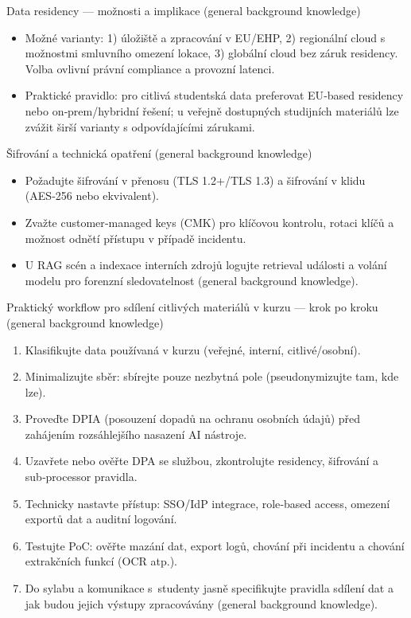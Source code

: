 Data residency — možnosti a implikace (general background knowledge)
\begin{itemize}
  \item Možné varianty: 1) úložiště a zpracování v EU/EHP, 2) regionální cloud s možnostmi smluvního omezení lokace, 3) globální cloud bez záruk residency. Volba ovlivní právní compliance a provozní latenci.
  \item Praktické pravidlo: pro citlivá studentská data preferovat EU‑based residency nebo on‑prem/hybridní řešení; u veřejně dostupných studijních materiálů lze zvážit širší varianty s odpovídajícími zárukami.
\end{itemize}

Šifrování a technická opatření (general background knowledge)
\begin{itemize}
  \item Požadujte šifrování v přenosu (TLS 1.2+/TLS 1.3) a šifrování v klidu (AES‑256 nebo ekvivalent).
  \item Zvažte customer‑managed keys (CMK) pro klíčovou kontrolu, rotaci klíčů a možnost odnětí přístupu v případě incidentu.
  \item U RAG scén a indexace interních zdrojů logujte retrieval události a volání modelu pro forenzní sledovatelnost (general background knowledge).
\end{itemize}

Praktický workflow pro sdílení citlivých materiálů v kurzu — krok po kroku (general background knowledge)
\begin{enumerate}
  \item Klasifikujte data používaná v kurzu (veřejné, interní, citlivé/osobní).
  \item Minimalizujte sběr: sbírejte pouze nezbytná pole (pseudonymizujte tam, kde lze).
  \item Proveďte DPIA (posouzení dopadů na ochranu osobních údajů) před zahájením rozsáhlejšího nasazení AI nástroje.
  \item Uzavřete nebo ověřte DPA se službou, zkontrolujte residency, šifrování a sub‑processor pravidla.
  \item Technicky nastavte přístup: SSO/IdP integrace, role‑based access, omezení exportů dat a auditní logování.
  \item Testujte PoC: ověřte mazání dat, export logů, chování při incidentu a chování extrakčních funkcí (OCR atp.).
  \item Do sylabu a komunikace s studenty jasně specifikujte pravidla sdílení dat a jak budou jejich výstupy zpracovávány (general background knowledge).
\end{enumerate}

